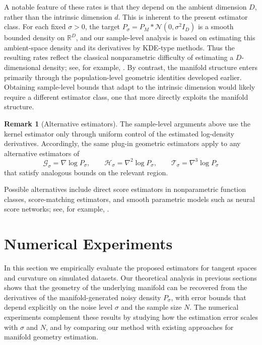 \documentclass[11pt]{article}
\theoremstyle{plain}
\theoremstyle{definition}
\newtheorem{remark}[theorem]{Remark}
\begin{document}
A notable feature of these rates is that they depend on the ambient dimension $D$, rather than the intrinsic dimension $d$.
This is inherent to the present estimator class. For each fixed $\sigma>0$, the target $P_\sigma = P_M*\mathcal N(0,\sigma^2 I_D)$ is a smooth bounded density on $\mathbb R^D$, and our sample-level analysis is based on estimating this ambient-space density and its derivatives by KDE-type methods.
Thus the resulting rates reflect the classical nonparametric difficulty of estimating a $D$-dimensional density; see, for example, \citet{goldenshluger2014adaptive}.
By contrast, the manifold structure enters primarily through the population-level geometric identities developed earlier. Obtaining sample-level bounds that adapt to the intrinsic dimension would likely require a different estimator class, one that more directly exploits the manifold structure.

\begin{remark}[Alternative estimators]
The sample-level arguments above use the kernel estimator only through uniform control of the estimated log-density derivatives. Accordingly, the same plug-in geometric estimators apply to any alternative estimators of
\[
\mathcal G_\sigma=\nabla\log P_\sigma,\qquad
\mathcal H_\sigma=\nabla^2\log P_\sigma,\qquad
\mathcal T_\sigma=\nabla^3\log P_\sigma
\]
that satisfy analogous bounds on the relevant region.

Possible alternatives include direct score estimators in nonparametric function classes, score-matching estimators, and smooth parametric models such as neural
score networks; see, for example, \citet{Hyvrinen2005EstimationON,Sriperumbudur2017,li2018gradient,Song2019SlicedSM}.
\end{remark}


\section{Numerical Experiments}\label{sec:numerical}
In this section we empirically evaluate the proposed estimators for tangent spaces and curvature on simulated datasets. Our theoretical analysis in previous sections shows that the geometry of the underlying manifold can be recovered from the derivatives of the manifold-generated noisy density $P_\sigma$, with error bounds that depend explicitly on the noise level $\sigma$ and the sample size $N$. The numerical experiments complement these results by studying how the estimation error scales with $\sigma$ and $N$, and by comparing our method with existing approaches for manifold geometry estimation.
\end{document}
